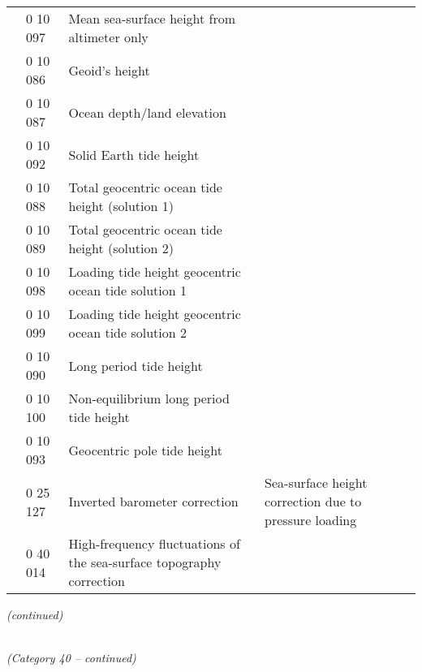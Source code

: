 \begin{longtable}[]{@{}llll@{}}
& 0 10 097 & Mean sea-surface height from altimeter only &\tabularnewline
& 0 10 086 & Geoid's height &\tabularnewline
& 0 10 087 & Ocean depth/land elevation &\tabularnewline
& 0 10 092 & Solid Earth tide height &\tabularnewline
& 0 10 088 & Total geocentric ocean tide height (solution 1) &\tabularnewline
& 0 10 089 & Total geocentric ocean tide height (solution 2) &\tabularnewline
& 0 10 098 & Loading tide height geocentric ocean tide solution 1 &\tabularnewline
& 0 10 099 & Loading tide height geocentric ocean tide solution 2 &\tabularnewline
& 0 10 090 & Long period tide height &\tabularnewline
& 0 10 100 & Non-equilibrium long period tide height &\tabularnewline
& 0 10 093 & Geocentric pole tide height &\tabularnewline
& 0 25 127 & Inverted barometer correction & Sea-surface height correction due to pressure loading\tabularnewline
& 0 40 014 & High-frequency fluctuations of the sea-surface topography correction &\tabularnewline
\bottomrule
\end{longtable}

\emph{(continued)}

\emph{\\
(Category 40 -- continued)}

